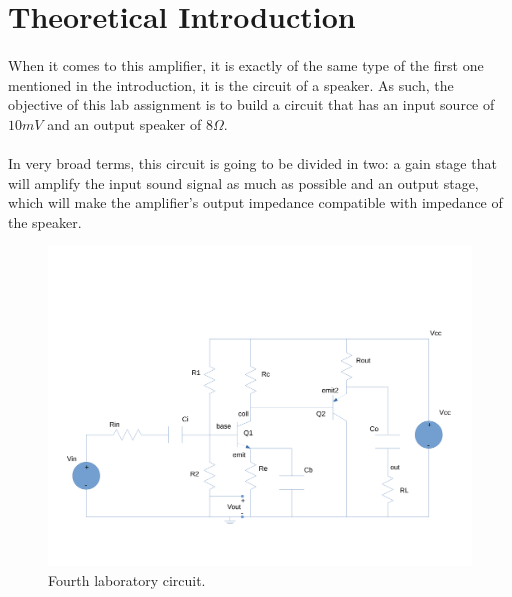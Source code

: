 \section{Theoretical Introduction}
\label{sec:theoretical}


\paragraph{}When it comes to this amplifier, it is exactly of the same type of the first one mentioned in the introduction, it is the circuit of a speaker. As such, the objective of this lab assignment is to build a circuit that has an input source of  $10mV$ and an output speaker of $8\Omega$.

\paragraph{}In very broad terms, this circuit is going to be divided in two: a gain stage that will amplify the input sound signal as much as possible and an output stage, which will make the amplifier's output impedance compatible with impedance of the speaker.  

\begin{figure}[h] \centering
	\includegraphics[width=0.8\linewidth]{circuit.pdf}
	\caption{Fourth laboratory circuit.}
	\label{fig:circuit}
\end{figure}


